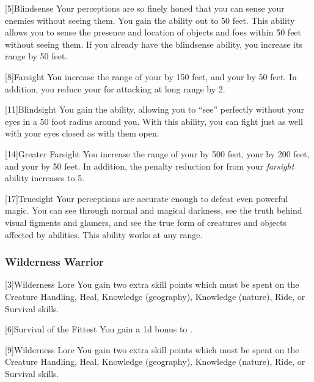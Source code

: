            [5]{Blindsense}
            Your perceptions are so finely honed that you can sense your enemies without seeing them.
            You gain the  ability out to 50 feet.
            This ability allows you to sense the presence and location of objects and foes within 50 feet without seeing them.
            If you already have the blindsense ability, you increase its range by 50 feet.

            [8]{Farsight}
            You increase the range of your  by 150 feet, and your  by 50 feet.
            In addition, you reduce your  for attacking at long range by 2.

            [11]{Blindsight}
            You gain the  ability, allowing you to ``see'' perfectly without your eyes in a 50 foot radius around you.
            With this ability, you can fight just as well with your eyes closed as with them open.

            [14]{Greater Farsight}
            You increase the range of your  by 500 feet, your  by 200 feet, and your  by 50 feet.
            In addition, the penalty reduction for  from your \textit{farsight} ability increases to 5.

            [17]{Truesight} 
            Your perceptions are accurate enough to defeat even powerful magic.
            You can see through normal and magical darkness, see the truth behind visual figments and glamers, and see the true form of creatures and objects affected by  abilities.
            This ability works at any range.

        \subsubsection{Wilderness Warrior}
            [3]{Wilderness Lore} You gain two extra skill points which must be spent on the Creature Handling, Heal, Knowledge (geography), Knowledge (nature), Ride, or Survival skills.

            [6]{Survival of the Fittest}
            You gain a \plus1d bonus to .

            [9]{Wilderness Lore} You gain two extra skill points which must be spent on the Creature Handling, Heal, Knowledge (geography), Knowledge (nature), Ride, or Survival skills.

